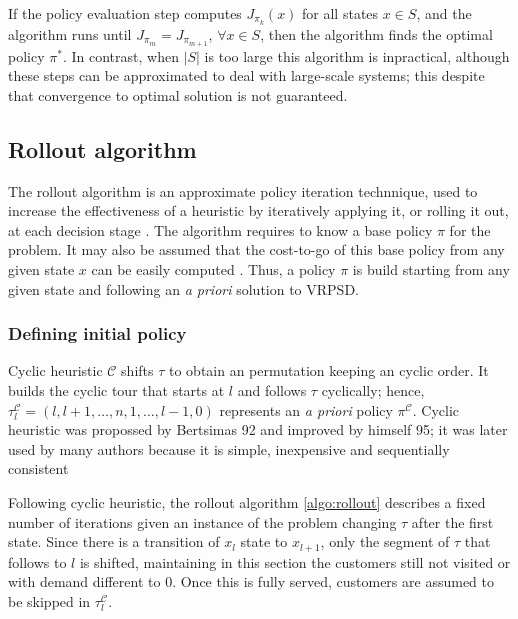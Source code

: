 If the policy evaluation step computes $J_{\pi_k}(x)$ for all states $x \in S$, and the algorithm runs until  $J_{\pi_m} = J_{\pi_{m+1}}$, $\forall x \in S$, then the algorithm finds the optimal policy $\pi^*$. In contrast, when $|S|$ is too large this algorithm is inpractical, although these steps can be approximated to deal with large-scale systems; this despite that convergence to optimal solution is not guaranteed.


\subsection{Rollout algorithm}

The rollout algorithm is an approximate policy iteration technnique, used to increase the effectiveness of a heuristic by iteratively applying it, or rolling it out, at each decision stage \cite{Goodson2010}. The algorithm requires to know a base policy $\pi$ for the problem. It may also be assumed that the cost-to-go of this base policy from any given state $x$ can be easily computed \cite{secomandi_comparing_2000}. Thus, a policy $\pi$ is build starting from any given state and following an \textit{a priori} solution to VRPSD.


\subsubsection{Defining initial policy}\label{sec:initial_policy}


Cyclic heuristic $\mathcal{C}$ shifts $\tau$ to obtain an permutation keeping an cyclic order. It builds the cyclic tour that starts at $l$ and follows $\tau$ cyclically; hence, $\tau^\mathcal{C}_l = (l, l+1, \ldots , n , 1 , \ldots , l-1, 0)$ represents an \textit{a priori} policy $\pi^\mathcal{C}$. Cyclic heuristic was propossed by Bertsimas 92  and improved by himself 95; it was later used by many authors because it is simple, inexpensive and sequentially consistent \cite{Secomandi_1998}%

Following cyclic heuristic, the rollout algorithm \ref{algo:rollout} describes a fixed number of iterations given an instance of the problem changing $\tau$ after the first state. Since there is a transition of $x_l$ state to $x_{l+1}$, only the segment of $\tau$ that follows to $l$ is shifted, maintaining in this section the customers still not visited or with demand different to $0$. Once this is fully served, customers are assumed to be skipped in $\tau^\mathcal{C}_l$.

